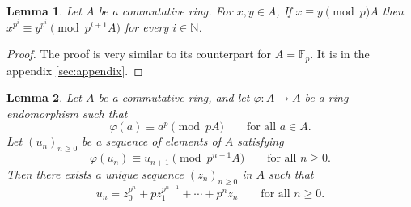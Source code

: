 \documentclass[oneside, a4paper, onecolumn, 11pt]{article}
\newtheorem{lemma}{Lemma}
\theoremstyle{definition}
\begin{document}
\begin{lemma}\label{equiv_A}
  Let $A$ be a commutative ring. For $x,y\in A$, If $x\equiv y \pmod pA$ then $x^{p^i}\equiv y^{p^i} \pmod {p^{i+1}A}$ for every $i\in\mathbb{N}$.
\end{lemma}
\begin{proof}
  The proof is very similar to its counterpart for $A=\mathbb{F}_p$. It is in the appendix \ref{sec:appendix}.
\end{proof}

\begin{lemma}\label{lemma:frobenius_congruence}
Let $A$ be a commutative ring, and let $\varphi:A\to A$ be a ring endomorphism such that
\[\varphi(a)\equiv a^p \pmod{pA}\qquad \text{for all } a\in A.\]
Let $(u_n)_{n\geq 0}$ be a sequence of elements of $A$ satisfying
\[\varphi(u_n)\equiv u_{n+1}\pmod{p^{n+1}A}\qquad \text{for all } n\geq 0.\]
Then there exists a unique sequence $(z_n)_{n\geq 0}$ in $A$ such that
\[u_n=z_0^{p^n}+pz_1^{p^{n-1}}+\cdots+p^n z_n\qquad \text{for all } n\geq 0.\]
\end{lemma}
\end{document}
